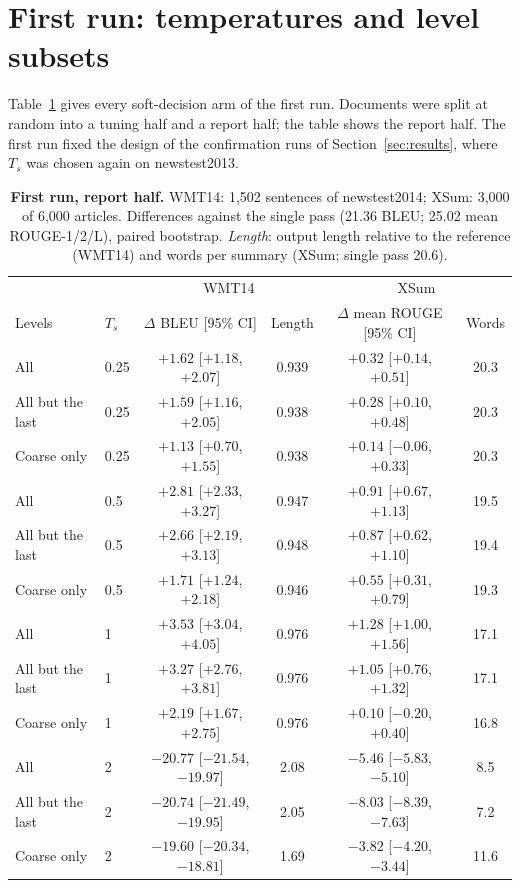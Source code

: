 \documentclass[11pt]{article}
\begin{document}
\section{First run: temperatures and level subsets}
\label{app:grid}

Table~\ref{tab:grid} gives every soft-decision arm of the first run. Documents were split at random into a tuning
half and a report half; the table shows the report half. The first run fixed the design of the confirmation runs of
Section~\ref{sec:results}, where $T_s$ was chosen again on newstest2013.

\begin{table}[H]
\centering
\small
\renewcommand{\arraystretch}{1.12}
\setlength{\tabcolsep}{5pt}
\begin{tabular*}{\linewidth}{@{\extracolsep{\fill}}llcccc@{}}
\toprule
 & & \multicolumn{2}{c}{WMT14} & \multicolumn{2}{c}{XSum} \\
Levels & $T_s$ & $\Delta$ BLEU [95\% CI] & Length & $\Delta$ mean ROUGE [95\% CI] & Words \\
\midrule
All & 0.25 & $+1.62$ [$+1.18$, $+2.07$] & 0.939 & $+0.32$ [$+0.14$, $+0.51$] & 20.3 \\
All but the last & 0.25 & $+1.59$ [$+1.16$, $+2.05$] & 0.938 & $+0.28$ [$+0.10$, $+0.48$] & 20.3 \\
Coarse only & 0.25 & $+1.13$ [$+0.70$, $+1.55$] & 0.938 & $+0.14$ [$-0.06$, $+0.33$] & 20.3 \\
\midrule
All & 0.5 & $+2.81$ [$+2.33$, $+3.27$] & 0.947 & $+0.91$ [$+0.67$, $+1.13$] & 19.5 \\
All but the last & 0.5 & $+2.66$ [$+2.19$, $+3.13$] & 0.948 & $+0.87$ [$+0.62$, $+1.10$] & 19.4 \\
Coarse only & 0.5 & $+1.71$ [$+1.24$, $+2.18$] & 0.946 & $+0.55$ [$+0.31$, $+0.79$] & 19.3 \\
\midrule
All & 1 & $+3.53$ [$+3.04$, $+4.05$] & 0.976 & $+1.28$ [$+1.00$, $+1.56$] & 17.1 \\
All but the last & 1 & $+3.27$ [$+2.76$, $+3.81$] & 0.976 & $+1.05$ [$+0.76$, $+1.32$] & 17.1 \\
Coarse only & 1 & $+2.19$ [$+1.67$, $+2.75$] & 0.976 & $+0.10$ [$-0.20$, $+0.40$] & 16.8 \\
\midrule
All & 2 & $-20.77$ [$-21.54$, $-19.97$] & 2.08 & $-5.46$ [$-5.83$, $-5.10$] & 8.5 \\
All but the last & 2 & $-20.74$ [$-21.49$, $-19.95$] & 2.05 & $-8.03$ [$-8.39$, $-7.63$] & 7.2 \\
Coarse only & 2 & $-19.60$ [$-20.34$, $-18.81$] & 1.69 & $-3.82$ [$-4.20$, $-3.44$] & 11.6 \\
\bottomrule
\end{tabular*}
\caption{\textbf{First run, report half.} WMT14: 1,502 sentences of newstest2014; XSum: 3,000 of 6,000 articles. Differences
against the single pass (21.36 BLEU; 25.02 mean ROUGE-1/2/L), paired bootstrap. \emph{Length}: output length relative
to the reference (WMT14) and words per summary (XSum; single pass 20.6).}
\label{tab:grid}
\end{table}
\end{document}
